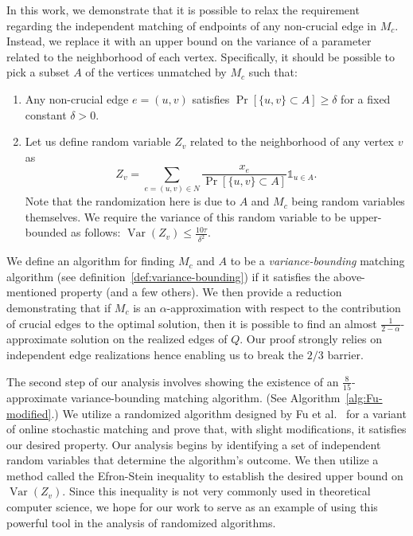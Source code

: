 \documentclass[letterpaper,11pt]{article}
\DeclareMathOperator{\var}{Var}
\begin{document}
In this work, we demonstrate that it is possible to relax the requirement regarding the independent matching of endpoints of any non-crucial edge in $M_c$. Instead, we replace it with an upper bound on the variance of a parameter related to the neighborhood of each vertex. Specifically, it should be possible to pick a subset $A$ of the vertices unmatched by $M_c$ such that:

\begin{enumerate}
    \item Any non-crucial edge $e=(u,v)$  satisfies $\Pr[\{u,v\}\subset A] \geq \delta$ for a fixed constant $\delta>0$.
    
    \item Let us define random variable $Z_v$ related to the neighborhood of any vertex $v$ as \begin{equation}\label{eq:ejjrke}
         Z_v = \sum_{e=(u,v)\in N}\frac{x_e}{\Pr[\{u,v\}\subset A]}\mathds{1}_{u\in A}.
    \end{equation} 
    Note that the randomization here is due to $A$ and $M_c$ being random variables themselves. We require the variance of this random variable to be upper-bounded as follows: $\var(Z_v)\leq \frac{10\tau}{\delta^2}.$ 
\end{enumerate} 
We define an algorithm for finding $M_c$ and $A$ to be a {\em variance-bounding} matching algorithm (see definition~\ref{def:variance-bounding}) if it satisfies the above-mentioned property (and a few others). We then provide a reduction demonstrating  that if $M_c$ is an $\alpha$-approximation with respect to the contribution of crucial edges to the optimal solution, then it is possible to find an almost $\frac{1}{2-\alpha}$-approximate solution on the realized edges of $Q$. Our proof strongly relies on independent edge realizations hence enabling us to break the $2/3$ barrier. 

The second step of our analysis involves showing the existence of an $\frac{8}{15}$-approximate variance-bounding matching algorithm. (See Algorithm~\ref{alg:Fu-modified}.) We utilize a randomized algorithm designed by Fu et al.~\cite{Fu} for a variant of online stochastic matching and prove that, with slight modifications, it satisfies our desired property. Our analysis begins by identifying a set of independent random variables that determine the algorithm's outcome. We then utilize a method called the Efron-Stein inequality to establish the desired  upper bound on $\var(Z_v)$. Since this inequality is not very  commonly used in theoretical computer science, we hope for our work to serve as an example of using this powerful tool in the analysis of randomized algorithms.
\end{document}
